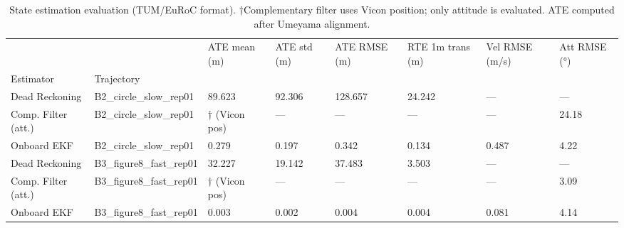 \begin{table}
\caption{State estimation evaluation (TUM/EuRoC format). †Complementary filter uses Vicon position; only attitude is evaluated. ATE computed after Umeyama alignment.}
\label{tab:estimation}
\begin{tabular}{llllllll}
\toprule
 &  & ATE mean (m) & ATE std (m) & ATE RMSE (m) & RTE 1m trans (m) & Vel RMSE (m/s) & Att RMSE (°) \\
Estimator & Trajectory &  &  &  &  &  &  \\
\midrule
Dead Reckoning & B2_circle_slow_rep01 & 89.623 & 92.306 & 128.657 & 24.242 & — & — \\
\cline{1-8}
Comp. Filter (att.) & B2_circle_slow_rep01 & † (Vicon pos) & — & — & — & — & 24.18 \\
\cline{1-8}
Onboard EKF & B2_circle_slow_rep01 & 0.279 & 0.197 & 0.342 & 0.134 & 0.487 & 4.22 \\
\cline{1-8}
Dead Reckoning & B3_figure8_fast_rep01 & 32.227 & 19.142 & 37.483 & 3.503 & — & — \\
\cline{1-8}
Comp. Filter (att.) & B3_figure8_fast_rep01 & † (Vicon pos) & — & — & — & — & 3.09 \\
\cline{1-8}
Onboard EKF & B3_figure8_fast_rep01 & 0.003 & 0.002 & 0.004 & 0.004 & 0.081 & 4.14 \\
\cline{1-8}
\bottomrule
\end{tabular}
\end{table}

